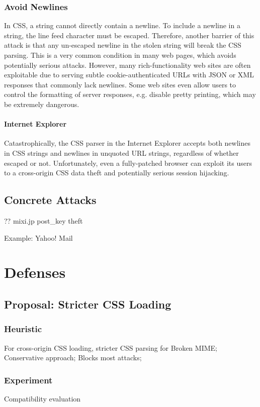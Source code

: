 \documentclass{acm_proc_article-sp}
\begin{document}
\subsubsection{Avoid Newlines}
In CSS, a string cannot directly contain a newline. To include a newline in a string, the line feed character must be escaped. Therefore, another barrier of this attack is that any un-escaped newline in the stolen string will break the CSS parsing. This is a very common condition in many web pages, which avoids potentially serious attacks. However, many rich-functionality web sites are often exploitable due to serving subtle cookie-authenticated URLs with JSON or XML responses that commonly lack newlines. Some web sites even allow users to control the formatting of server responses, e.g. disable pretty printing, which may be extremely dangerous.
\paragraph{Internet Explorer}
Catastrophically, the CSS parser in the Internet Explorer accepts both newlines in CSS strings and newlines in unquoted URL strings, regardless of whether escaped or not. Unfortunately, even a fully-patched browser can exploit its users to a cross-origin CSS data theft and potentially serious session hijacking.

\subsection{Concrete Attacks}
?? mixi.jp post\_key theft\cite{cssxss}

Example: Yahoo! Mail

\section{Defenses}

\subsection{Proposal: Stricter CSS Loading}
\subsubsection{Heuristic}
For cross-origin CSS loading, stricter CSS parsing for Broken MIME;
Conservative approach;
Blocks most attacks;

\subsubsection{Experiment}
Compatibility evaluation
\end{document}
